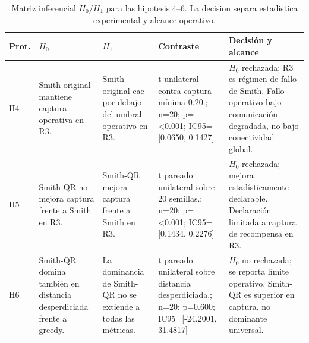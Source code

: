 \begin{table}[H]
\centering
\caption{Matriz inferencial $H_0$/$H_1$ para las hipotesis 4--6. La decision separa estadistica experimental y alcance operativo.}
\label{tab:hypothesis-decision-base-b}
\scriptsize
\begin{tabularx}{\textwidth}{@{}>{\raggedright\arraybackslash}p{}>{\raggedright\arraybackslash}p{}>{\raggedright\arraybackslash}p{}>{\raggedright\arraybackslash}p{}>{\raggedright\arraybackslash}X@{}}
\toprule
Prot. & $H_0$ & $H_1$ & Contraste & Decisión y alcance \\
\midrule
H4 & Smith original mantiene captura operativa en R3. & Smith original cae por debajo del umbral operativo en R3. & t unilateral contra captura mínima 0.20.; n=20; p=\textless{}0.001; IC95=[0.0650, 0.1427] & $H_0$ rechazada; R3 es régimen de fallo de Smith. Fallo operativo bajo comunicación degradada, no bajo conectividad global. \\
H5 & Smith-QR no mejora captura frente a Smith en R3. & Smith-QR mejora captura frente a Smith en R3. & t pareado unilateral sobre 20 semillas.; n=20; p=\textless{}0.001; IC95=[0.1434, 0.2276] & $H_0$ rechazada; mejora estadísticamente declarable. Declaración limitada a captura de recompensa en R3. \\
H6 & Smith-QR domina también en distancia desperdiciada frente a greedy. & La dominancia de Smith-QR no se extiende a todas las métricas. & t pareado unilateral sobre distancia desperdiciada.; n=20; p=0.600; IC95=[-24.2001, 31.4817] & $H_0$ no rechazada; se reporta límite operativo. Smith-QR es superior en captura, no dominante universal. \\
\bottomrule
\end{tabularx}
\end{table}

